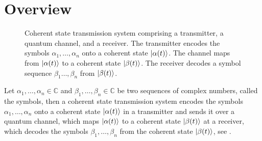 \section{Overview}

\begin{figure}[htb]
	\centering
	
	\caption{Coherent state transmission system comprising a transmitter, a quantum channel, and a receiver. The transmitter encodes the symbols $\alpha_1,\dots,\alpha_n$ onto a coherent state $\ket{\alpha(t)}$. The channel maps from $\ket{\alpha(t)}$ to a coherent state $\ket{\beta(t)}$. The receiver decodes a symbol sequence $\beta_1\dots,\beta_n$ from $\ket{\beta(t)}$.}\label{fig:transmission_system}
\end{figure}
Let $\alpha_1,\dots,\alpha_n\in\mathbb{C}$ and $\beta_1,\dots,\beta_n\in\mathbb{C}$ be two sequences of complex numbers, called the symbols, then a coherent state transmission system encodes the symbols $\alpha_1,\dots,\alpha_n$ onto a coherent state $\ket{\alpha(t)}$ in a transmitter and sends it over a quantum channel, which maps $\ket{\alpha(t)}$ to a coherent state $\ket{\beta(t)}$ at a receiver, which decodes the symbols $\beta_1,\dots,\beta_n$ from the coherent state $\ket{\beta(t)}$, see .